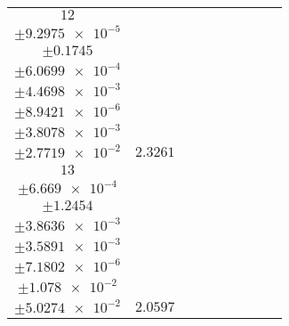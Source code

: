 \documentclass[8pt]{article}
\begin{document}
\begin{longtable}[l]{c c c c c c c c c}
$\num{12}$ & \begin{tabular}[c]{@{}c@{}}$\num{3.1258e-2}$ \\ $\pm\num{9.2975e-5}$\end{tabular} & \begin{tabular}[c]{@{}c@{}}$\num{-0.70782}$ \\ $\pm\num{0.1745}$\end{tabular} & \begin{tabular}[c]{@{}c@{}}$\num{-11.306}$ \\ $\pm\num{6.0699e-4}$\end{tabular} & \begin{tabular}[c]{@{}c@{}}$\num{1.5981e+3}$ \\ $\pm\num{4.4698e-3}$\end{tabular} & \begin{tabular}[c]{@{}c@{}}$\num{3.197}$ \\ $\pm\num{8.9421e-6}$\end{tabular} & \begin{tabular}[c]{@{}c@{}}$\num{1.1925}$ \\ $\pm\num{3.8078e-3}$\end{tabular} & \begin{tabular}[c]{@{}c@{}}$\num{4.2908}$ \\ $\pm\num{2.7719e-2}$\end{tabular} & $\num{2.3261}$\\
$\num{13}$ & \begin{tabular}[c]{@{}c@{}}$\num{2.5355e-2}$ \\ $\pm\num{6.669e-4}$\end{tabular} & \begin{tabular}[c]{@{}c@{}}$\num{-1.0027}$ \\ $\pm\num{1.2454}$\end{tabular} & \begin{tabular}[c]{@{}c@{}}$\num{-7.0984}$ \\ $\pm\num{3.8636e-3}$\end{tabular} & \begin{tabular}[c]{@{}c@{}}$\num{1.6022e+3}$ \\ $\pm\num{3.5891e-3}$\end{tabular} & \begin{tabular}[c]{@{}c@{}}$\num{3.2053}$ \\ $\pm\num{7.1802e-6}$\end{tabular} & \begin{tabular}[c]{@{}c@{}}$\num{1.0764}$ \\ $\pm\num{1.078e-2}$\end{tabular} & \begin{tabular}[c]{@{}c@{}}$\num{3.7033}$ \\ $\pm\num{5.0274e-2}$\end{tabular} & $\num{2.0597}$\\

\end{longtable}
\end{document}
